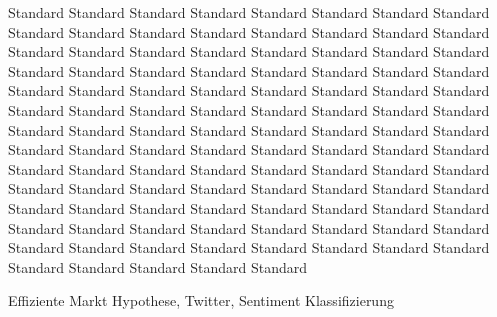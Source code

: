 \noindent
\normalsize
Standard Standard Standard Standard Standard Standard Standard Standard Standard Standard Standard Standard Standard Standard Standard Standard Standard Standard Standard Standard Standard Standard Standard Standard Standard Standard Standard Standard Standard Standard Standard Standard Standard Standard Standard Standard Standard Standard Standard Standard Standard Standard Standard Standard Standard Standard Standard Standard Standard Standard Standard Standard Standard Standard Standard Standard Standard Standard Standard Standard Standard Standard Standard Standard Standard Standard Standard Standard Standard Standard Standard Standard Standard Standard Standard Standard Standard Standard Standard Standard Standard Standard Standard Standard Standard Standard Standard Standard Standard Standard Standard Standard Standard Standard Standard Standard Standard Standard Standard Standard Standard Standard Standard Standard Standard Standard Standard Standard Standard 

\SomeSpace
{}
\normalsize
\noindent
Effiziente Markt Hypothese, Twitter, Sentiment Klassifizierung